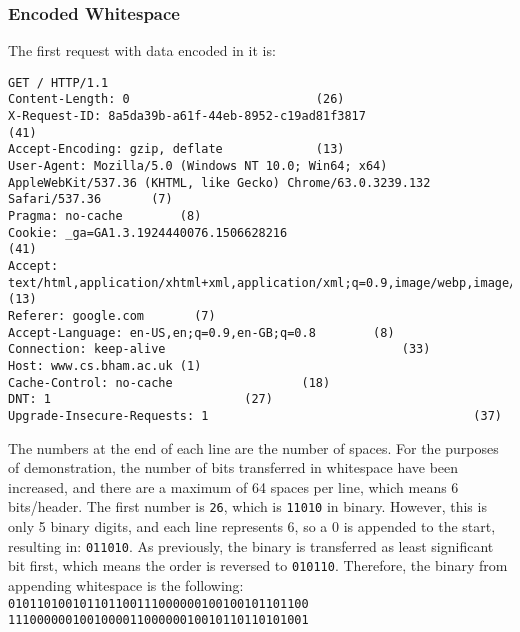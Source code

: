 \subsubsection{Encoded Whitespace}
The first request with data encoded in it is:
\begin{lstlisting}[basicstyle={\ttfamily},breaklines=true,numbers=none,showstringspaces=true,showlines=true,showspaces=false]
GET / HTTP/1.1
Content-Length: 0                          (26)
X-Request-ID: 8a5da39b-a61f-44eb-8952-c19ad81f3817                                         (41)
Accept-Encoding: gzip, deflate             (13)
User-Agent: Mozilla/5.0 (Windows NT 10.0; Win64; x64) AppleWebKit/537.36 (KHTML, like Gecko) Chrome/63.0.3239.132 Safari/537.36       (7)
Pragma: no-cache        (8)
Cookie: _ga=GA1.3.1924440076.1506628216                                         (41)
Accept: text/html,application/xhtml+xml,application/xml;q=0.9,image/webp,image/apng,*/*;q=0.8             (13)
Referer: google.com       (7)
Accept-Language: en-US,en;q=0.9,en-GB;q=0.8        (8)
Connection: keep-alive                                 (33)
Host: www.cs.bham.ac.uk (1)
Cache-Control: no-cache                  (18)
DNT: 1                           (27)
Upgrade-Insecure-Requests: 1                                     (37)

\end{lstlisting}
The numbers at the end of each line are the number of spaces.
For the purposes of demonstration, the number of bits transferred in whitespace have been increased, and there are a maximum of 64 spaces per line, which means 6 bits/header.
The first number is \texttt{26}, which is \texttt{11010} in binary.
However, this is only 5 binary digits, and each line represents 6, so a 0 is appended to the start, resulting in: \texttt{011010}. As previously, the binary is transferred as least significant bit first, which means the order is reversed to \texttt{010110}.
Therefore, the binary from appending whitespace is the following:\\
\texttt{010110100101101100111000000100100101101100\\
111000000100100001100000010010110110101001}\\
\vspace{0.3cm}
